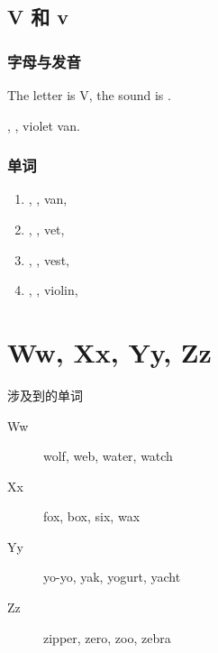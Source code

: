 
\section{V 和 v}

\subsection{字母与发音}

The letter is V, the sound is .

, , violet van.

\subsection{单词}

\begin{enumerate}
  \item {}, , van, 
  \item {}, , vet, 
  \item {}, , vest, 
  \item {}, , violin, 
\end{enumerate}



\chapter{Ww, Xx, Yy, Zz}

\noindent 涉及到的单词

\begin{description}
  \item[Ww] wolf, web, water, watch
  \item[Xx] fox, box, six, wax
  \item[Yy] yo-yo, yak, yogurt, yacht
  \item[Zz] zipper, zero, zoo, zebra
\end{description}